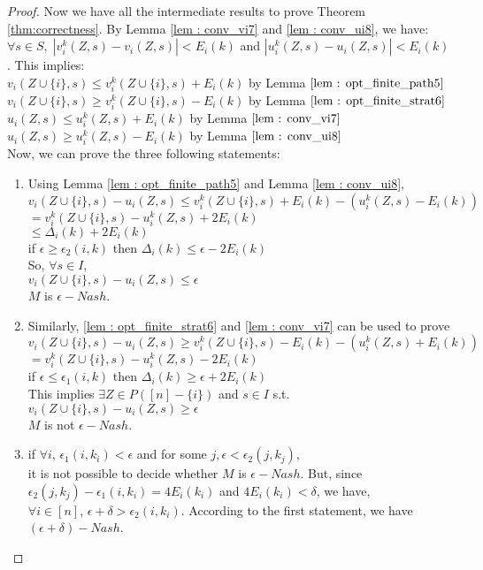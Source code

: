 \begin{proof}
Now we have all the intermediate results to prove Theorem \ref{thm:correctness}. By Lemma \ref{lem : conv_vi7} and \ref{lem : conv_ui8}, we have:  $\forall s \in S,\;|v_i^{k}(Z,s)-v_i(Z,s)| < E_i(k)$ and $|u_i^{k}(Z,s) - u_i(Z,s)| < E_i(k)$. This implies:\\
$v_i(Z \cup \{i\},s) \le v_i^{k}(Z \cup \{i\},s) + E_i(k)$  by Lemma $ \ref{lem : opt_finite_path5}$\\
$v_i(Z \cup \{i\},s) \ge v_i^{k}(Z \cup \{i\},s) - E_i(k)$  by Lemma $ \ref{lem : opt_finite_strat6}$\\
$u_i(Z ,s) \le u_i^{k}(Z ,s) + E_i(k)$  by Lemma $ \ref{lem : conv_vi7}$\\
$u_i(Z ,s) \ge u_i^{k}(Z ,s) - E_i(k)$  by Lemma $ \ref{lem : conv_ui8}$\\

Now, we can prove the three following statements:
\begin{enumerate}
	\item Using Lemma \ref{lem : opt_finite_path5} and Lemma \ref{lem : conv_ui8},\\
	$v_i(Z \cup \{i\},s) - u_i(Z ,s) \le v_i^{k}(Z \cup \{i\},s) + E_i(k) - (u_i^{k}(Z ,s) - E_i(k) )$\\
	$=v_i^{k}(Z \cup \{i\},s) - u_i^{k}(Z ,s) + 2E_i(k)  $\\
	$\le \Delta_i(k) + 2E_i(k) $\\
	if $\epsilon \ge \epsilon_2(i,k)$ then $\Delta_i(k) \le \epsilon - 2E_i(k)$\\
	So, $\forall s \in I$, \\
	$v_i(Z \cup \{i\},s) - u_i(Z ,s) \le \epsilon$\\
	$M$ is $\epsilon-Nash$.
	\item Similarly, \ref{lem : opt_finite_strat6} and \ref{lem : conv_vi7} can be used to prove\\
	$v_i(Z \cup \{i\},s) - u_i(Z ,s) \ge v_i^{k}(Z \cup \{i\},s) - E_i(k) - (u_i^{k}(Z ,s) + E_i(k) )$\\
	$=v_i^{k}(Z \cup \{i\},s) - u_i^{k}(Z ,s) - 2E_i(k)  $\\
	if $\epsilon \le \epsilon_1(i,k)$ then $\Delta_i(k) \ge \epsilon + 2E_i(k)$\\
	This implies $\exists Z \in P([n]-\{i\})$ and $s \in I$ s.t.\\
	$v_i(Z \cup \{i\},s) - u_i(Z ,s) \ge \epsilon$\\
	$M$ is not $\epsilon-Nash$.
	\item if $\forall i$, $\epsilon_1(i,k_i) < \epsilon$ and for some $j, \epsilon < \epsilon_2(j,k_j)$, \\
	it is not possible to decide whether $M$ is $\epsilon-Nash$. But, since $\epsilon_2(j,k_j)-\epsilon_1(i,k_i)= 4E_i(k_i)$ and $4E_i(k_i) < \delta$, we have,\\
	$\forall i \in [n]$, $\epsilon + \delta > \epsilon_2(i,k_i)$. According to the first statement, we have $(\epsilon + \delta)-Nash$.
\end{enumerate}
\end{proof}


